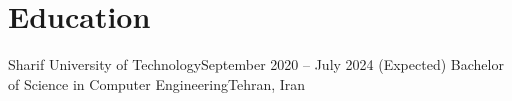 \section{Education}
\resumeSubHeadingListStart
\resumeSubheading
{Sharif University of Technology}{September 2020 -- July 2024 (Expected)}
{Bachelor of Science in Computer Engineering}{Tehran, Iran}
\vspace*{0.2cm}
\begin{multicols}{3}
    \begin{itemize}
    \end{itemize}
\end{multicols}

\resumeSubHeadingListEnd